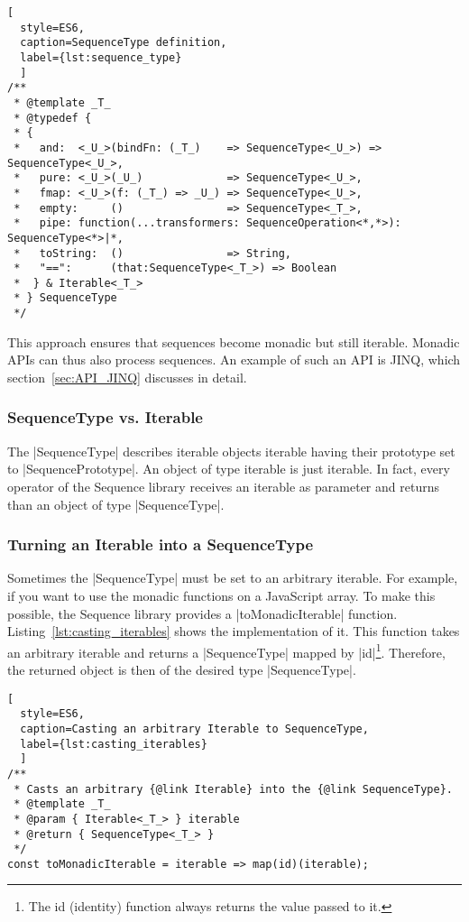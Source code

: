 \begin{lstlisting}[
  style=ES6, 
  caption=SequenceType definition,
  label={lst:sequence_type}
  ]
/**
 * @template _T_
 * @typedef {
 * {
 *   and:  <_U_>(bindFn: (_T_)    => SequenceType<_U_>) => SequenceType<_U_>,
 *   pure: <_U_>(_U_)             => SequenceType<_U_>,
 *   fmap: <_U_>(f: (_T_) => _U_) => SequenceType<_U_>,
 *   empty:     ()                => SequenceType<_T_>,
 *   pipe: function(...transformers: SequenceOperation<*,*>): SequenceType<*>|*,
 *   toString:  ()                => String,
 *   "==":      (that:SequenceType<_T_>) => Boolean
 *  } & Iterable<_T_>
 * } SequenceType
 */
\end{lstlisting}

This approach ensures that sequences become monadic but still iterable.
Monadic APIs can thus also process sequences. An example of such an API is
JINQ, which section~\ref{sec:API_JINQ} discusses in detail.

\subsubsection{SequenceType vs. Iterable} %
\label{subsub:SequenceType vs. Iterable}
The |SequenceType| describes iterable objects iterable having their
prototype set to |SequencePrototype|. An object of type iterable is just
iterable. In fact, every operator of the Sequence library receives an iterable as
parameter and returns than an object of type |SequenceType|.

\subsubsection{Turning an Iterable into a SequenceType}
\label{subsub:Turn Iterables into SequenceType}
Sometimes the |SequenceType| must be set to an arbitrary iterable. For example,
if you want to use the monadic functions on a JavaScript array. To make this
possible, the Sequence library provides a |toMonadicIterable| function.
Listing~\ref{lst:casting_iterables} shows the
implementation of it. This function takes an arbitrary iterable and returns a
|SequenceType| mapped by |id|\footnote{The id (identity) function always
returns the value passed to it.}. 
Therefore, the returned object is then of the desired type |SequenceType|.

\begin{lstlisting}[
  style=ES6, 
  caption=Casting an arbitrary Iterable to SequenceType,
  label={lst:casting_iterables}
  ]
/**
 * Casts an arbitrary {@link Iterable} into the {@link SequenceType}.
 * @template _T_
 * @param { Iterable<_T_> } iterable
 * @return { SequenceType<_T_> }
 */
const toMonadicIterable = iterable => map(id)(iterable);
\end{lstlisting}
